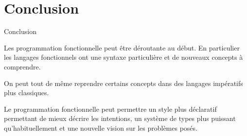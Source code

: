 \documentclass[aspectratio=169]{beamer}
\begin{document}
\section{Conclusion}

\begin{frame}{Conclusion}

Les programmation fonctionnelle peut être déroutante au début. En particulier les langages fonctionnels ont une syntaxe particulière et de nouveaux concepts à comprendre.

On peut tout de même reprendre certains concepts dans des langages impératifs plus classiques.

Le programmation fonctionnelle peut permettre un style plus déclaratif permettant de mieux décrire les intentions, un système de types plus puissant qu'habituellement et une nouvelle vision sur les problèmes posés.
    
\end{frame}
\end{document}

